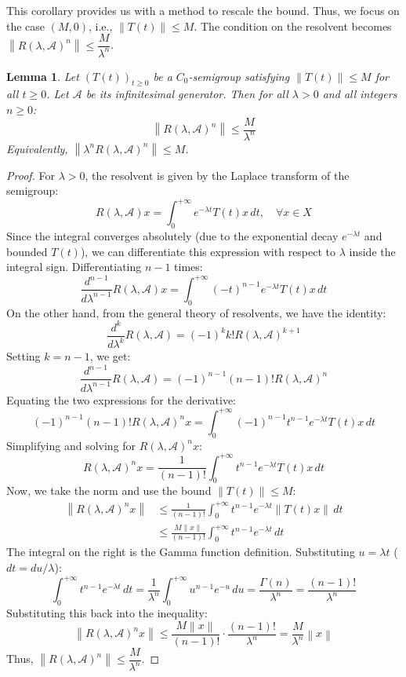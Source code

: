 \documentclass[12pt, oneside]{book}
\newtheorem{lemma}{Lemma}[section]
\newcommand{\norm}[1]{\left\lVert#1\right\rVert}
\newcommand{\A}{\mathscr{A}}
\begin{document}
This corollary provides us with a method to rescale the bound. Thus, we focus on the case $(M, 0)$, i.e., $\norm{T(t)} \le M$.
The condition on the resolvent becomes $\norm{R(\lambda,\A)^n} \le \dfrac{M}{\lambda^n}$.

\begin{lemma} \label{sc:mnbound}
	Let $(T(t))_{t \ge 0}$ be a $C_0$-semigroup satisfying $\norm{T(t)} \le M$ for all $t \ge 0$. Let $\A$ be its infinitesimal generator. Then for all $\lambda > 0$ and all integers $n \ge 0$:
$$
\norm{R(\lambda, \A)^n} \le \frac{M}{\lambda^n}
$$
Equivalently, $\norm{\lambda^n R(\lambda, \A)^n} \le M$.
\end{lemma}

\begin{proof}
For $\lambda > 0$, the resolvent is given by the Laplace transform of the semigroup:
$$
	R(\lambda, \A)x = \int_0^{+\infty} e^{-\lambda t} T(t)x \, dt, \quad \forall x \in X
$$
Since the integral converges absolutely (due to the exponential decay $e^{-\lambda t}$ and bounded $T(t)$), we can differentiate this expression with respect to $\lambda$ inside the integral sign. Differentiating $n-1$ times:
$$
	\frac{d^{n-1}}{d\lambda^{n-1}} R(\lambda, \A)x = \int_0^{+\infty} (-t)^{n-1} e^{-\lambda t} T(t)x \, dt
$$
On the other hand, from the general theory of resolvents, we have the identity:
$$
\frac{d^{k}}{d\lambda^{k}} R(\lambda, \A) = (-1)^k k! R(\lambda, \A)^{k+1}
$$
Setting $k = n-1$, we get:
$$
\frac{d^{n-1}}{d\lambda^{n-1}} R(\lambda, \A) = (-1)^{n-1} (n-1)! R(\lambda, \A)^n
$$
Equating the two expressions for the derivative:
$$
	(-1)^{n-1} (n-1)! R(\lambda, \A)^n x = \int_0^{+\infty} (-1)^{n-1} t^{n-1} e^{-\lambda t} T(t)x \, dt
$$
Simplifying and solving for $R(\lambda, \A)^n x$:
$$
	R(\lambda, \A)^n x = \frac{1}{(n-1)!} \int_0^{+\infty} t^{n-1} e^{-\lambda t} T(t)x \, dt
$$
Now, we take the norm and use the bound $\|T(t)\| \le M$:
\begin{align*}
	\norm{R(\lambda, \A)^n x} &\le \frac{1}{(n-1)!} \int_0^{+\infty} t^{n-1} e^{-\lambda t} \norm{T(t)x} \, dt \\
				  &\le \frac{M \norm{x}}{(n-1)!} \int_0^{+\infty} t^{n-1} e^{-\lambda t} \, dt
\end{align*}
The integral on the right is the Gamma function definition. Substituting $u = \lambda t$ ($dt = du/\lambda$):
$$
	\int_0^{+\infty} t^{n-1} e^{-\lambda t} \, dt = \frac{1}{\lambda^n} \int_0^{+\infty} u^{n-1} e^{-u} \, du = \frac{\Gamma(n)}{\lambda^n} = \frac{(n-1)!}{\lambda^n}
$$
Substituting this back into the inequality:
$$
\norm{R(\lambda, \A)^n x} \le \frac{M \norm{x}}{(n-1)!} \cdot \frac{(n-1)!}{\lambda^n} = \frac{M}{\lambda^n} \norm{x}
$$
Thus, $\norm{R(\lambda, \A)^n} \le \dfrac{M}{\lambda^n}$.
\end{proof}
\end{document}
